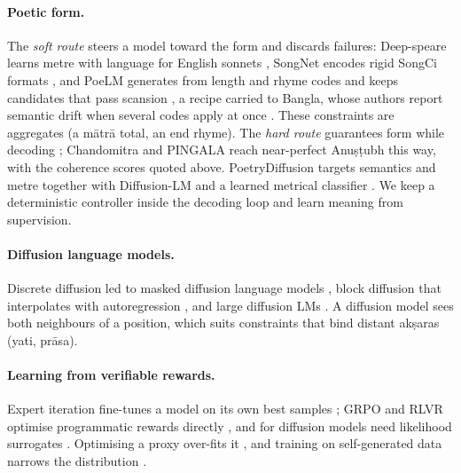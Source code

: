 \documentclass[11pt]{article}
\begin{document}
\paragraph{Poetic form.} The \emph{soft route} steers a model toward the form and discards failures:
Deep-speare learns metre with language for English sonnets \citep{lau2018deepspeare}, SongNet encodes rigid
SongCi formats \citep{li2020songnet}, and PoeLM generates from length and rhyme codes and keeps candidates that
pass scansion \citep{ormazabal2022poelm}, a recipe carried to Bangla, whose authors report semantic drift when
several codes apply at once \citep{amina2025}. These constraints are aggregates (a mātrā total, an end rhyme).
The \emph{hard route} guarantees form while decoding \citep{ghazvininejad2016,lu2021neurologic,geng2023grammar};
Chandomitra and PINGALA reach near-perfect Anuṣṭubh this way, with the coherence scores quoted above.
PoetryDiffusion targets semantics and metre together with Diffusion-LM and a learned metrical classifier
\citep{hu2024poetrydiffusion,li2022diffusionlm}. We keep a deterministic controller inside the decoding loop
and learn meaning from supervision.

\paragraph{Diffusion language models.} Discrete diffusion \citep{austin2021d3pm} led to masked diffusion
language models \citep{sahoo2024mdlm}, block diffusion that interpolates with autoregression
\citep{arriola2025block}, and large diffusion LMs \citep{nie2025llada}. A diffusion model sees both
neighbours of a position, which suits constraints that bind distant akṣaras (yati, prāsa).

\paragraph{Learning from verifiable rewards.} Expert iteration fine-tunes a model on its own best samples
\citep{anthony2017exit,zelikman2022star,gulcehre2023rest}; GRPO and RLVR optimise programmatic rewards
directly \citep{shao2024deepseekmath,lambert2024tulu3}, and for diffusion models need likelihood surrogates
\citep{zhao2025d1}. Optimising a proxy over-fits it \citep{gao2023overoptimization}, and training on
self-generated data narrows the distribution \citep{shumailov2024collapse}.
\end{document}
